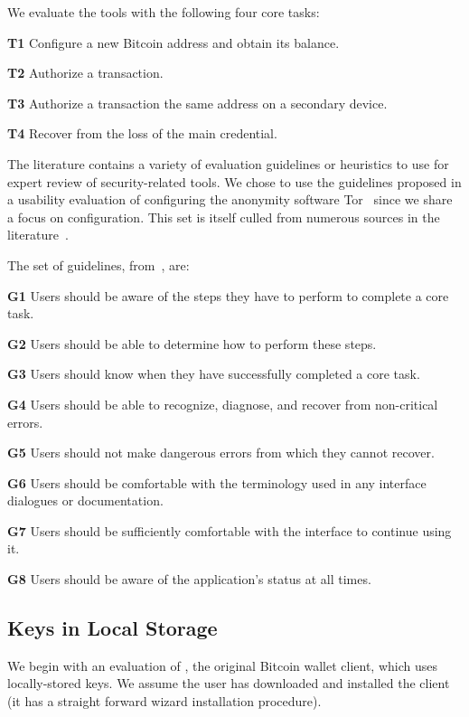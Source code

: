 We evaluate the tools with the following four core tasks:

\begin{compactlist}
	\item[\bf T1] Configure a new Bitcoin address and obtain its balance.\label{sec:ct-1}
	\item[\bf T2] Authorize a transaction.\label{sec:ct-2}
	\item[\bf T3] Authorize a transaction the same address on a secondary device.\label{sec:ct-3}
	\item[\bf T4] Recover from the loss of the main credential.\label{sec:ct-4}
\end{compactlist}

The literature contains a variety of evaluation guidelines or heuristics to use for expert review of security-related tools. We chose to use the guidelines proposed in a usability evaluation of configuring the anonymity software Tor~\cite{COA07} since we share a focus on configuration. This set is itself culled from numerous sources in the literature~\cite{WRLP94,WT99,Cra03,KBK05,COB06}.

The set of guidelines, from~\cite{COA07}, are:
	
\begin{compactlist}
	\item[\bf G1] Users should be aware of the steps they have to perform to complete a core task.
	\item[\bf G2] Users should be able to determine how to perform these steps.
	\item[\bf G3] Users should know when they have successfully completed a core task.
	\item[\bf G4] Users should be able to recognize, diagnose, and recover from non-critical errors.
	\item[\bf G5] Users should not make dangerous errors from which they cannot recover.
	\item[\bf G6] Users should be comfortable with the terminology used in any interface dialogues or documentation.
	\item[\bf G7] Users should be sufficiently comfortable with the interface to continue using it.
	\item[\bf G8] Users should be aware of the application's status at all times.
\end{compactlist}


\subsection{Keys in Local Storage}
We begin with an evaluation of \bitcoinclient, the original Bitcoin wallet client, which uses locally-stored keys. We assume the user has downloaded and installed the \bitcoinclient client (it has a straight forward wizard installation procedure).

